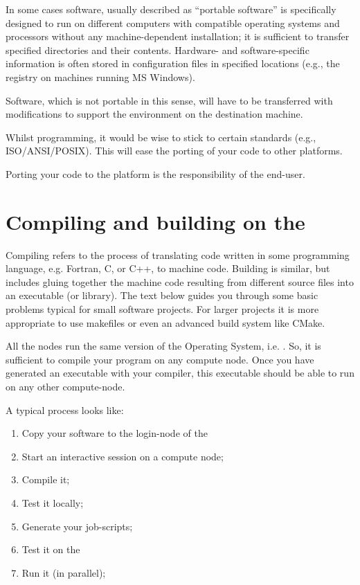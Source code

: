 In some cases software, usually described as ``portable software'' is
specifically designed to run on different computers with compatible operating
systems and processors without any machine-dependent installation; it is
sufficient to transfer specified directories and their contents. Hardware- and
software-specific information is often stored in configuration files in
specified locations (e.g., the registry on machines running MS Windows).

Software, which is not portable in this sense, will have to be transferred with
modifications to support the environment on the destination machine.

Whilst programming, it would be wise to stick to certain standards (e.g.,
ISO/ANSI/POSIX).  This will ease the porting of your code to other platforms.

Porting your code to the \operatingsystem platform is the responsibility of the
end-user.

\section{Compiling and building on the \hpc}

Compiling refers to the process of translating code written in some programming
language, e.g. Fortran, C, or C++, to machine code. Building is similar, but
includes gluing together the machine code resulting from different source files
into an executable (or library). The text below guides you through some basic
problems typical for small software projects. For larger projects it is more
appropriate to use makefiles or even an advanced build system like CMake.

All the \hpc nodes run the same version of the Operating System, i.e.
\operatingsystem. So, it is sufficient to compile your program on any compute
node.  Once you have generated an executable with your compiler, this
executable should be able to run on any other compute-node.

A typical process looks like:

\begin{enumerate}
\item  Copy your software to the login-node of the \hpc
\item  Start an interactive session on a compute node;
\item  Compile it;
\item  Test it locally;
\item  Generate your job-scripts;
\item  Test it on the \hpc
\item  Run it (in parallel);
\end{enumerate}

